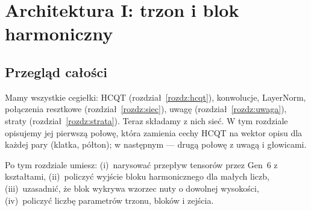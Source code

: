 \chapter{Architektura I: trzon i blok harmoniczny}\label{rozdz:architektura}

\section{Przegląd całości}

Mamy wszystkie cegiełki: HCQT (rozdział~\ref{rozdz:hcqt}), konwolucje, LayerNorm, połączenia resztkowe (rozdział~\ref{rozdz:siec}), uwagę (rozdział~\ref{rozdz:uwaga}), straty (rozdział~\ref{rozdz:strata}). Teraz składamy z nich sieć.
W tym rozdziale opisujemy jej pierwszą połowę, która zamienia cechy HCQT na wektor opisu dla każdej pary (klatka, półton); w następnym --- drugą połowę z uwagą i głowicami.

Po tym rozdziale umiesz: (i)~narysować przepływ tensorów przez Gen~6 z kształtami, (ii)~policzyć wyjście bloku harmonicznego dla małych liczb, (iii)~uzasadnić, że blok wykrywa wzorzec nuty o dowolnej wysokości, (iv)~policzyć liczbę parametrów trzonu, bloków i zejścia.


